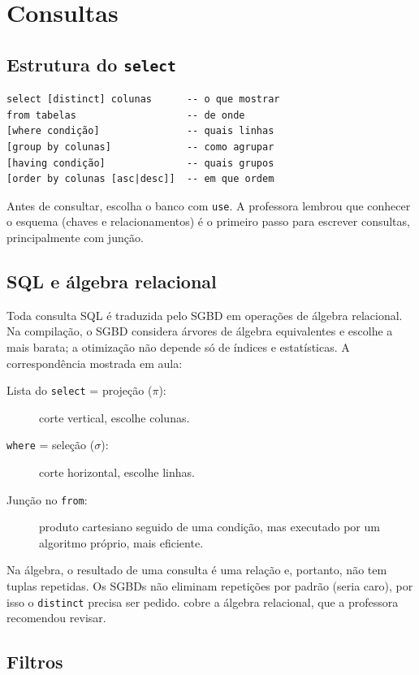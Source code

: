 \section{Consultas}

\subsection{Estrutura do \texttt{select}}

\begin{lstlisting}
select [distinct] colunas      -- o que mostrar
from tabelas                   -- de onde
[where condição]               -- quais linhas
[group by colunas]             -- como agrupar
[having condição]              -- quais grupos
[order by colunas [asc|desc]]  -- em que ordem
\end{lstlisting}

Antes de consultar, escolha o banco com \texttt{use}. A professora
lembrou que conhecer o esquema (chaves e relacionamentos) é o primeiro
passo para escrever consultas, principalmente com junção.

\subsection{SQL e álgebra relacional}

Toda consulta SQL é traduzida pelo SGBD em operações de álgebra
relacional. Na compilação, o SGBD considera árvores de álgebra
equivalentes e escolhe a mais barata; a otimização não depende só de
índices e estatísticas. A correspondência mostrada em aula:

\begin{description}
	\item[Lista do \texttt{select} = projeção ($\pi$):] corte vertical,
	escolhe colunas.
	\item[\texttt{where} = seleção ($\sigma$):] corte horizontal, escolhe
	linhas.
	\item[Junção no \texttt{from}:] produto cartesiano seguido de uma
	condição, mas executado por um algoritmo próprio, mais eficiente.
\end{description}

Na álgebra, o resultado de uma consulta é uma relação e, portanto, não
tem tuplas repetidas. Os SGBDs não eliminam repetições por padrão (seria
caro), por isso o \texttt{distinct} precisa ser pedido.
\textcite[cap. 6]{Elmasri2011} cobre a álgebra relacional, que a
professora recomendou revisar.

\subsection{Filtros}

